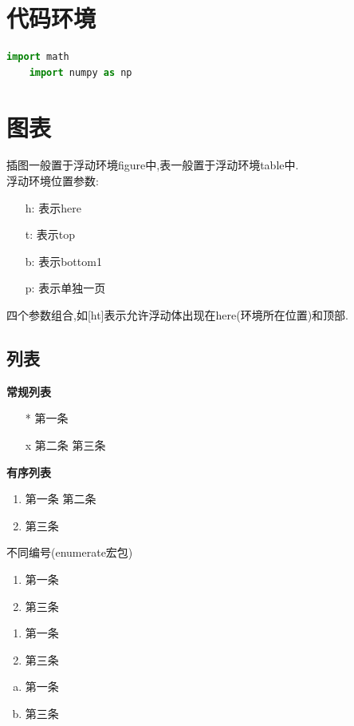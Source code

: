 \documentclass[UTF8,a4paper,8pt,no-math]{article} %
\numberwithin{equation}{section} %
\begin{document}
\section{代码环境}
\begin{lstlisting}[language=Python,keywordstyle=\bfseries\color{NavyBlue},basicstyle=\ttfamily]
	import math
	import numpy as np
\end{lstlisting}

\section{图表}
插图一般置于浮动环境figure中,表一般置于浮动环境table中.\\
浮动环境位置参数:
\begin{itemize}
	\item[h:]表示here
	\item[t:]表示top
	\item[b:]表示bottom1
	\item[p:]表示单独一页
\end{itemize}
四个参数组合,如[ht]表示允许浮动体出现在here(环境所在位置)和顶部.

\subsection{列表}

\textbf{常规列表}
\begin{itemize}
	\item[*] 第一条
		\item[x]第二条
		\subitem[aa]第三条
\end{itemize}

\textbf{有序列表}
\begin{enumerate}
	\item 第一条
	      \subitem 第二条
	\item 第三条
\end{enumerate}

不同编号(enumerate宏包)
\begin{enumerate}[(1)]
	\item 第一条
	\item 第三条
\end{enumerate}

\begin{enumerate}[1)]
	\item 第一条
	\item 第三条
\end{enumerate}

\begin{enumerate}[(a)]
	\item 第一条
	\item 第三条
\end{enumerate}
\end{document}
